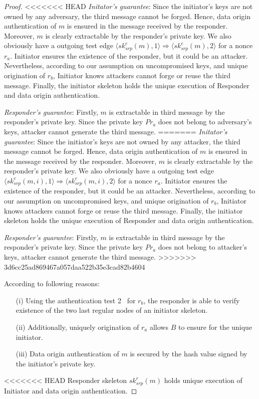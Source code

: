 \begin{proof}

<<<<<<< HEAD
\emph{Initator's guarantee}: Since the initiator’s keys are not owned by any adversary, the third message cannot be forged. Hence, data origin authentication of $m$ is ensured in the message received by the responder. Moreover, $m$ is clearly extractable by the responder's private key. 
We also obviously have a outgoing test edge $\langle sk^e_{srp}(m),1 \rangle \Rightarrow \langle sk^e_{srp}(m),2 \rangle$ for a nonce $r_a$. Initiator ensures the existence of the responder, but it could be an attacker. Nevertheless, according to our assumption on uncompromised keys, and unique origination of $r_b$, Initiator knows attackers cannot forge or reuse the third message. Finally, the initiator skeleton holds the unique execution of Responder and data origin authentication.

\emph{Responder's guarantee}: Firstly, $m$ is extractable in third message by the responder's private key. Since the private key $Pr_a$ does not belong to adversary’s keys, attacker cannot generate the third message. 
=======
\emph{Initator's guarantee}: Since the initiator’s keys are not owned by any attacker, the third message cannot be forged. Hence, data origin authentication of $m$ is ensured in the message received by the responder. Moreover, $m$ is clearly extractable by the responder's private key. 
We also obviously have a outgoing test edge $\langle sk^e_{srp}(m,i),1 \rangle \Rightarrow \langle sk^e_{srp}(m,i),2 \rangle$ for a nonce $r_a$. Initiator ensures the existence of the responder, but it could be an attacker. Nevertheless, according to our assumption on uncompromised keys, and unique origination of $r_b$, Initiator knows attackers cannot forge or reuse the third message. Finally, the initiator skeleton holds the unique execution of Responder and data origin authentication.

\emph{Responder's guarantee}: Firstly, $m$ is extractable in third message by the responder's private key. Since the private key $Pr_a$ does not belong to attacker’s keys, attacker cannot generate the third message. 
>>>>>>> 3d6cc25ad869467a057daa522b35e3cad82b4604

According to following reasons: 
\begin{enumerate}
\item[(i)] Using the authentication test 2~\cite{Guttman:2002:ATS:568264.568267} for $r_b$, the responder is able to verify existence of the two last regular nodes of an initiator skeleton.
\item[(ii)] Additionally, uniquely origination of $r_a$ allows $B$ to ensure for the unique initiator.
\item [(iii)] Data origin authentication of $m$ is secured by the hash value signed by the initiator's private key. 
\end{enumerate}

<<<<<<< HEAD
Responder skeleton $sk^r_{srp}(m)$ holds unique execution of Initiator and data origin authentication.
 \end{proof}

